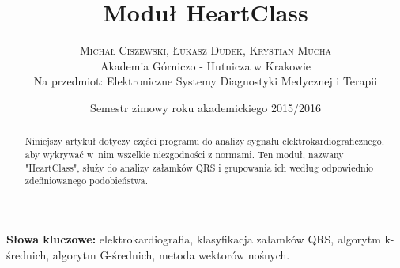 \documentclass[twoside]{article}
\title{\vspace{-15mm}\fontsize{24pt}{10pt}\selectfont\textbf{Moduł HeartClass}} %
\author{
\large
\textsc{Michał Ciszewski, Łukasz Dudek, Krystian Mucha}\\[2mm] %
\normalsize Akademia Górniczo - Hutnicza w Krakowie \\[1mm] %
\normalsize Na przedmiot: Elektroniczne Systemy Diagnostyki Medycznej i Terapii %
}
\date{Semestr zimowy roku akademickiego 2015/2016}
\begin{document}
\maketitle %

\thispagestyle{fancy} %

\tableofcontents
\vspace{10mm}
\begin{abstract}

\noindent Niniejszy artykuł dotyczy części programu do analizy sygnału elektrokardiograficznego, aby wykrywać w~nim wszelkie niezgodności z normami. Ten moduł, nazwany "HeartClass", służy do analizy załamków QRS i grupowania ich według odpowiednio zdefiniowanego podobieństwa.

\end{abstract}

\smallskip
\noindent \textbf{Słowa kluczowe:} elektrokardiografia, klasyfikacja załamków QRS, algorytm k-średnich, algorytm G-średnich, metoda wektorów nośnych.














\clearpage




\end{document}
